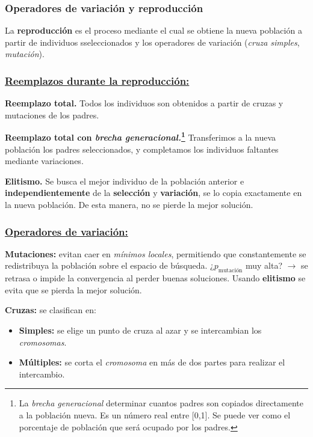 \documentclass[10pt,a4paper]{article}
\begin{document}
\subsubsection{Operadores de variación y reproducción}

La \textbf{reproducción} es el proceso mediante el cual se obtiene la nueva población a partir de individuos sseleccionados y los operadores de variación (\textit{cruza simples}, \textit{mutación}).

\subsubsection*{\underline{Reemplazos durante la reproducción:}}

\begin{description}
\item \textbf{Reemplazo total.} Todos los individuos son obtenidos a partir de cruzas y mutaciones de los padres.
\item \textbf{Reemplazo total con \textit{brecha generacional.}\footnote{La \textit{brecha generacional} determinar cuantos padres son copiados directamente a la población nueva. Es un número real entre [0,1]. Se puede ver como el porcentaje de población que será ocupado por los padres.}} Transferimos a la nueva población los padres seleccionados, y completamos los individuos faltantes mediante variaciones.
\item \textbf{Elitismo.} Se busca el mejor individuo de la población anterior e \textbf{independientemente} de la \textbf{selección} y \textbf{variación}, se lo copia exactamente en la nueva población. De esta manera, no se pierde la mejor solución.
\end{description}

\subsubsection*{\underline{Operadores de variación:}}

\begin{description}
\item \textbf{Mutaciones:} evitan caer en \textit{mínimos locales}, permitiendo que constantemente se redistribuya la población sobre el espacio de búsqueda. ¿$p_{\text{mutación}}$ muy alta? $\rightarrow$ se retrasa o impide la convergencia al perder buenas soluciones. Usando \textbf{elitismo} se  evita que se pierda la mejor solución.
\item \textbf{Cruzas:} se clasifican en:
\begin{itemize}
\item \textbf{Simples:} se elige un punto de cruza al azar y se intercambian los \textit{cromosomas}.
\item \textbf{Múltiples:} se corta el \textit{cromosoma} en más de dos partes para realizar el intercambio.
\end{itemize}
\end{description}
\end{document}
